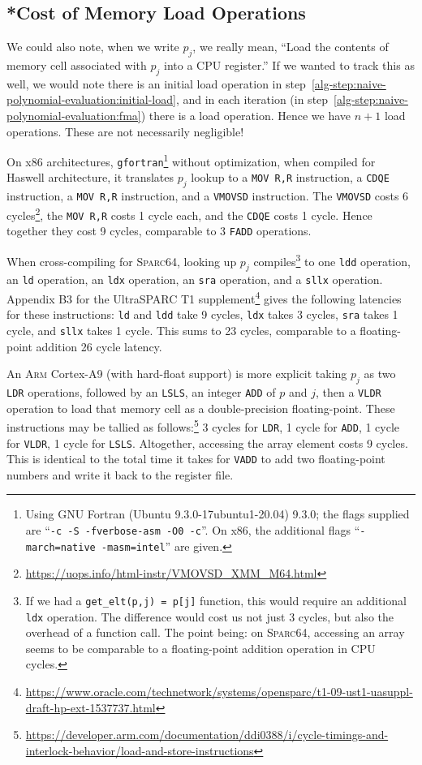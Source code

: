 \subsection{*Cost of Memory Load Operations}

We could also note, when we write $p_{j}$, we really mean, ``Load the
contents of memory cell associated with $p_{j}$ into a CPU register.''
If we wanted to track this as well, we would note there is an initial
load operation in
step~\ref{alg-step:naive-polynomial-evaluation:initial-load}, and in
each iteration (in step~\ref{alg-step:naive-polynomial-evaluation:fma})
there is a load operation. Hence we have $n+1$ load operations. These
are not necessarily negligible!

On x86 architectures, {\tt gfortran}\footnote{Using GNU Fortran (Ubuntu
9.3.0-17ubuntu1-20.04) 9.3.0; the flags supplied are ``\texttt{-c -S
  -fverbose-asm -O0 -c}''. On x86, the additional flags
``\texttt{-march=native -masm=intel}'' are given.} without optimization,
when compiled for Haswell architecture, it translates $p_{j}$ lookup to
a \texttt{MOV R,R} instruction, a \texttt{CDQE} instruction,
a \texttt{MOV R,R} instruction, and a \texttt{VMOVSD} instruction.
The \texttt{VMOVSD} costs 6
cycles\footnote{\url{https://uops.info/html-instr/VMOVSD_XMM_M64.html}},
the \texttt{MOV R,R} costs 1 cycle each, and the \texttt{CDQE} costs 1
cycle. Hence together they cost 9 cycles, comparable to 3 \texttt{FADD} operations.

When cross-compiling for \textsc{Sparc64}, looking up $p_{j}$
compiles\footnote{If we had a \texttt{get\_elt(p,j) = p[j]} function, this
would require an additional {\tt ldx} operation. The
difference would cost us not just 3 cycles, but also the overhead of a
function call. The point being: on \textsc{Sparc64}, accessing an array
seems to be comparable to a floating-point addition operation in CPU cycles.}
to one {\tt ldd} operation, an {\tt ld} operation, an {\tt ldx}
operation, an {\tt sra} operation, and a {\tt sllx} operation. Appendix
B3 for the UltraSPARC T1 supplement\footnote{\url{https://www.oracle.com/technetwork/systems/opensparc/t1-09-ust1-uasuppl-draft-hp-ext-1537737.html}}
gives the following latencies for these instructions: {\tt ld} and {\tt ldd}
take 9 cycles, {\tt ldx} takes 3 cycles, {\tt sra} takes 1 cycle, and
{\tt sllx} takes 1 cycle. This sums to 23 cycles, comparable to a
floating-point addition 26 cycle latency.

An \textsc{Arm} Cortex-A9 (with hard-float support) is more explicit
taking $p_{j}$ as two \texttt{LDR} operations, followed by an
\texttt{LSLS}, an integer \texttt{ADD} of $p$ and $j$, then a
\texttt{VLDR} operation to load that memory cell as a double-precision
floating-point. These instructions may be tallied as follows:\footnote{\url{https://developer.arm.com/documentation/ddi0388/i/cycle-timings-and-interlock-behavior/load-and-store-instructions}}
3 cycles for \texttt{LDR}, 1 cycle for \texttt{ADD}, 1 cycle for \texttt{VLDR},
1 cycle for \texttt{LSLS}. Altogether, accessing the array element costs
9 cycles. This is identical to the total time it takes for \texttt{VADD}
to add two floating-point numbers and write it back to the register
file.


